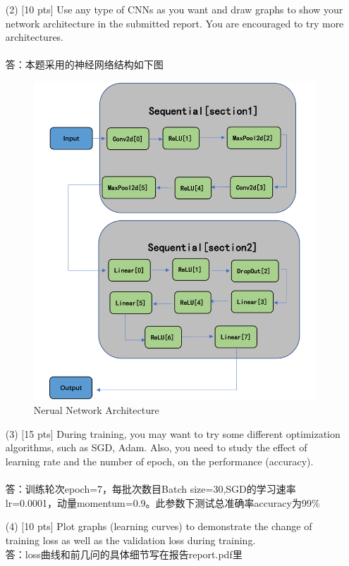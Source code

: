 \documentclass{article}
\begin{document}
\begin{enumerate}
		    \item[(2)] [10 pts] Use any type of CNNs as you want and draw graphs to show your network architecture in the submitted report. You are encouraged to try more architectures.
\\\\答：本题采用的神经网络结构如下图\\
		\begin{figure}[htbp]
			\centering
			\includegraphics[scale=0.5]{Architecture_3_2.png}
			\caption{Nerual Network Architecture}
		\end{figure}
		    
		    \item [(3)] [15 pts] During training, you may want to try some different optimization algorithms, such as SGD, Adam. Also, you need to study the effect of learning rate and the number of epoch, on the performance (accuracy).
 \\\\答：训练轮次epoch=7，每批次数目Batch size=30,SGD的学习速率lr=0.0001，动量momentum=0.9。此参数下测试总准确率accuracy为99\%\\
		    \item [(4)] [10 pts] Plot graphs (learning curves) to demonstrate the change of training loss as well as the validation loss during training.
\\答：loss曲线和前几问的具体细节写在报告report.pdf里\\
\end{enumerate}
\end{document}
